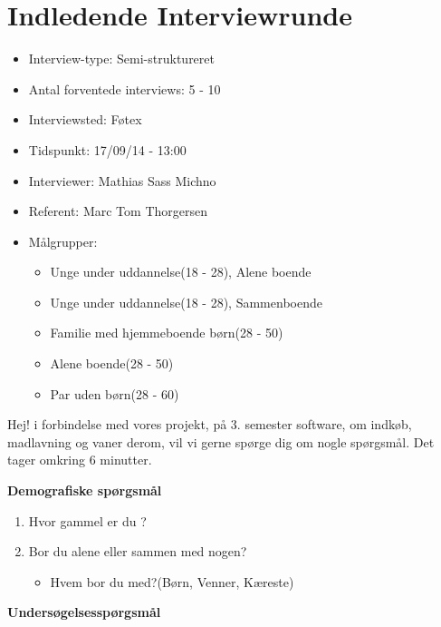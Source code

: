 \chapter{Indledende Interviewrunde}\label{Interview1}

\begin{itemize}[nolistsep,noitemsep]
	\setlength{\itemsep}{0em}
   \item Interview-type: Semi-struktureret
   \item Antal forventede interviews: 5 - 10
   \item Interviewsted: Føtex
   \item Tidspunkt: 17/09/14 - 13:00
   \item Interviewer: Mathias Sass Michno
   \item Referent: Marc Tom Thorgersen
   \item Målgrupper:
   	\begin{itemize}[nolistsep,noitemsep]
   		\item Unge under uddannelse(18 - 28), Alene boende
   		\item Unge under uddannelse(18 - 28), Sammenboende
   		\item Familie med hjemmeboende børn(28 - 50)
	    \item Alene boende(28 - 50)
   		\item Par uden børn(28 - 60)	
   	\end{itemize} 
\end{itemize}

Hej! i forbindelse med vores projekt, på 3. semester software, om indkøb, madlavning og vaner derom,  vil vi gerne spørge dig om nogle spørgsmål. Det tager omkring 6 minutter.

\textbf{Demografiske spørgsmål}
\begin{enumerate}[topsep=0ex]
	\setlength{\itemsep}{0em}
	\item  Hvor gammel er du ?
	\item  Bor du alene eller sammen med nogen?
	\begin{itemize}
	\item Hvem bor du med?(Børn, Venner, Kæreste)
	\end{itemize} 
\end{enumerate}

\textbf{Undersøgelsesspørgsmål}
		   
